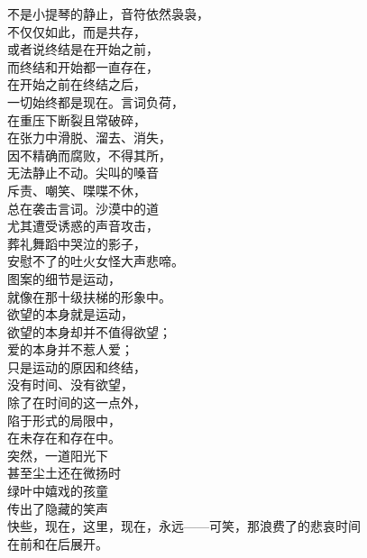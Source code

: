 \documentclass{article}
\begin{document}
不是小提琴的静止，音符依然袅袅， \\
不仅仅如此，而是共存， \\
或者说终结是在开始之前， \\
而终结和开始都一直存在， \\
在开始之前在终结之后， \\
一切始终都是现在。言词负荷， \\
在重压下断裂且常破碎， \\
在张力中滑脱、溜去、消失， \\
因不精确而腐败，不得其所， \\
无法静止不动。尖叫的嗓音 \\
斥责、嘲笑、喋喋不休， \\
总在袭击言词。沙漠中的道 \\
尤其遭受诱惑的声音攻击， \\
葬礼舞蹈中哭泣的影子， \\
安慰不了的吐火女怪大声悲啼。 \\
图案的细节是运动， \\
就像在那十级扶梯的形象中。 \\
欲望的本身就是运动， \\
欲望的本身却并不值得欲望； \\
爱的本身并不惹人爱； \\
只是运动的原因和终结， \\
没有时间、没有欲望， \\
除了在时间的这一点外， \\
陷于形式的局限中， \\
在未存在和存在中。 \\
突然，一道阳光下 \\
甚至尘土还在微扬时 \\
绿叶中嬉戏的孩童 \\
传出了隐藏的笑声 \\
快些，现在，这里，现在，永远——可笑，那浪费了的悲哀时间 \\
在前和在后展开。
\end{document}
